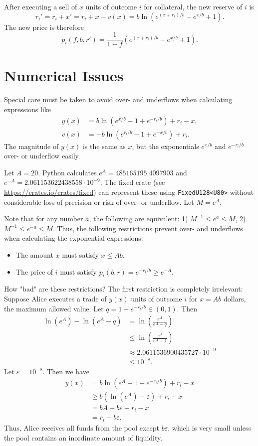 \documentclass[12pt]{article}
\begin{document}
After executing a sell of $x$ units of outcome $i$ for collateral, the new reserve of $i$ is
\[
    r_i' = r_i + x' = r_i + x - v(x) = b \ln (e^{(x + r_i)/b} - e^{x/b} + 1).
\]
The new price is therefore
\[
    p_i(f, b, r') = \frac{1}{1-f} (e^{(x + r_i)/b} - e^{x/b} + 1).
\]

\section{Numerical Issues}

Special care must be taken to avoid over- and underflows when calculating expressions like
\begin{align*}
    y(x) &= b \ln (e^{x/b} - 1 + e^{-r_i/b}) + r_i - x, \\
    v(x) &= -b \ln (e^{r_i/b} - 1 + e^{-x/b}) + r_i.
\end{align*}
The magnitude of $y(x)$ is the same as $x$, but the exponentials $e^{x/b}$ and $e^{-r_i/b}$ over- or underflow easily.

Let $A = 20$. Python calculates $e^A = 485165195.4097903$ and $e^{-A} = 2.061153622438558 \cdot 10^{-9}$. The fixed crate (see \url{https://crates.io/crates/fixed}) can represent these using \texttt{FixedU128<U80>} without considerable loss of precision or risk of over- or underflow. Let $M = e^A$.

Note that for any number $a$, the following are equivalent: 1) $M^{-1} \leq e^a \leq M$, 2) $M^{-1} \leq e^{-a} \leq M$. Thus, the following restrictions prevent over- and underflows when calculating the exponential expressions:

\begin{itemize}
    \item The amount $x$ must satisfy $x \leq Ab$.
    \item The price of $i$ must satisfy $p_i(b, r) = e^{-r_i/b} \geq e^{-A}$.
\end{itemize}

How "bad" are these restrictions? The first restriction is completely irrelevant: Suppose Alice executes a trade of $y(x)$ units of outcome $i$ for $x = Ab$ dollars, the maximum allowed value. Let $q = 1 - e^{-r_i/b} \in (0, 1)$. Then
\begin{align*}
    \ln(e^A) - \ln(e^A - q) &= \ln\left(\frac{e^A}{e^A - q}\right) \\
    &\leq \ln\left(\frac{e^A}{e^A - 1}\right) \\
    &\approx 2.0611536900435727 \cdot 10^{-9} \\
    &\leq 10^{-8}.
\end{align*}
Let $\varepsilon = 10^{-8}$. Then we have
\begin{align*}
    y(x) &= b\ln(e^A - 1 + e^{-r_i/b}) + r_i - x \\
    &\geq b(\ln(e^A) - \varepsilon) + r_i - x \\
    &= bA - b\varepsilon + r_i - x \\
    &= r_i - b\varepsilon.
\end{align*}
Thus, Alice receives all funds from the pool except $b \varepsilon$, which is very small unless the pool contains an inordinate amount of liquidity.
\end{document}
